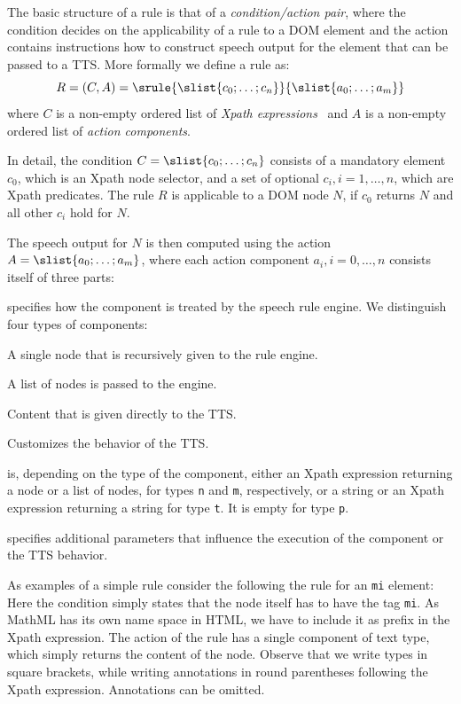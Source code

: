 \documentclass{sig-alternate}
\begin{document}
The basic structure of a rule is that of a \emph{condition/action pair}, where
the condition decides on the applicability of a rule to a DOM element and the
action contains instructions how to construct speech output for the element
that can be passed to a TTS. More formally we define a rule as:
\[R= ({C},{A}) = \srule{\slist{c_0;\ldots;c_n}}{\slist{a_0;\ldots;a_m}} \] where
$C$ is a non-empty ordered list of \emph{Xpath expressions}~\cite{clark1999xpl} and
$A$ is a non-empty ordered list of \emph{action components}.

In detail, the condition $C=\slist{c_0;\ldots;c_n}$ consists of a mandatory
element $c_0$, which is an Xpath node selector, and a set of optional $c_i,
i=1,\ldots,n$, which are Xpath predicates. The rule $R$ is applicable to a DOM
node $N$, if $c_0$ returns $N$ and all other $c_i$ hold for $N$.

The speech output for $N$ is then computed using the action $A =
\slist{a_0;\ldots;a_m}$, where each action component $a_i, i=0,\ldots,n$
consists itself of three parts: 
\begin{description}\itemsep-1.5pt
\item[Type] specifies how the component is treated by the speech rule engine. We
  distinguish four types of components:
  \begin{description}\itemsep-1.5pt
  \item[Node (denoted \texttt{n})] A single node that is recursively given to
    the rule engine.
  \item[Multi (\texttt{m})] A list of nodes is passed to the engine.
  \item[Text (\texttt{t})] Content that is given directly to the TTS.
  \item[Personality (\texttt{p})] Customizes the behavior of the TTS.
  \end{description}
\item[Content] is, depending on the type of the component, either an Xpath
  expression returning a node or a list of nodes, for types \texttt{n} and
  \texttt{m}, respectively, or a string or an Xpath expression returning a
  string for type \texttt{t}.  It is empty for type \texttt{p}.
\item[Annotation] specifies additional parameters that influence the execution
  of the component or the TTS behavior.
\end{description}

As examples of a simple rule consider the following the rule for an \texttt{mi}
element:  Here the condition simply states
that the node itself has to have the tag \texttt{mi}. As MathML has its own name
space in HTML, we have to include it as prefix in the Xpath expression. The
action of the rule has a single component of text type, which simply returns the
content of the node. Observe that we write types in square brackets, while
writing annotations in round parentheses following the Xpath
expression. Annotations can be omitted.
\end{document}
